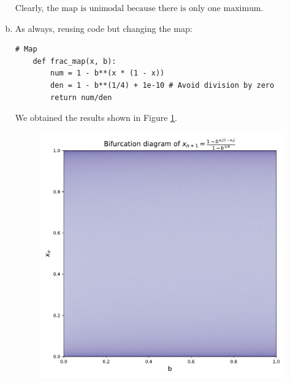 \begin{enumerate}[(a)]
    Clearly, $\boxed{\text{the map is unimodal because there is only one maximum.}}$

    \item As always, reusing code but changing the map:
    \begin{lstlisting}[style=pythonstyle]
    # Map
    def frac_map(x, b):
        num = 1 - b**(x * (1 - x))
        den = 1 - b**(1/4) + 1e-10 # Avoid division by zero
        return num/den
    \end{lstlisting}
    We obtained the results shown in Figure \ref{fig:3b}.
    \begin{figure}[!ht]
        \centering
        \includegraphics[scale=0.65]{images/b_power.pdf}
        \label{fig:3b}
    \end{figure}


\end{enumerate}
